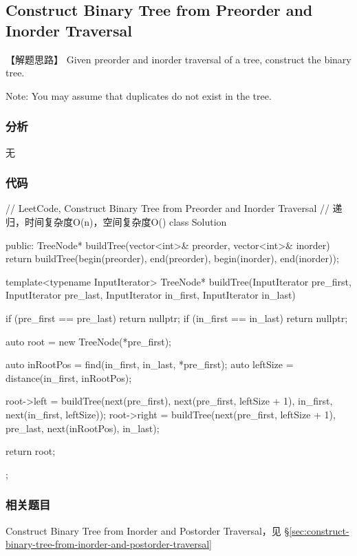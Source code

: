 \subsection{Construct Binary Tree from Preorder and Inorder Traversal}
\label{sec:construct-binary-tree-from-preorder-and-inorder-traversal}


【解题思路】
Given preorder and inorder traversal of a tree, construct the binary tree.

Note:
You may assume that duplicates do not exist in the tree.


\subsubsection{分析}
无


\subsubsection{代码}
\begin{Code}
	// LeetCode, Construct Binary Tree from Preorder and Inorder Traversal
	// 递归，时间复杂度O(n)，空间复杂度O(\logn)
	class Solution {
		public:
		TreeNode* buildTree(vector<int>& preorder, vector<int>& inorder) {
			return buildTree(begin(preorder), end(preorder),
			begin(inorder), end(inorder));
		}
		
		template<typename InputIterator>
		TreeNode* buildTree(InputIterator pre_first, InputIterator pre_last,
		InputIterator in_first, InputIterator in_last) {
			if (pre_first == pre_last) return nullptr;
			if (in_first == in_last) return nullptr;
			
			auto root = new TreeNode(*pre_first);
			
			auto inRootPos = find(in_first, in_last, *pre_first);
			auto leftSize = distance(in_first, inRootPos);
			
			root->left = buildTree(next(pre_first), next(pre_first,
			leftSize + 1), in_first, next(in_first, leftSize));
			root->right = buildTree(next(pre_first, leftSize + 1), pre_last,
			next(inRootPos), in_last);
			
			return root;
		}
	};
\end{Code}


\subsubsection{相关题目}
\begindot
\item Construct Binary Tree from Inorder and Postorder Traversal，见 \S \ref{sec:construct-binary-tree-from-inorder-and-postorder-traversal}
\myenddot


